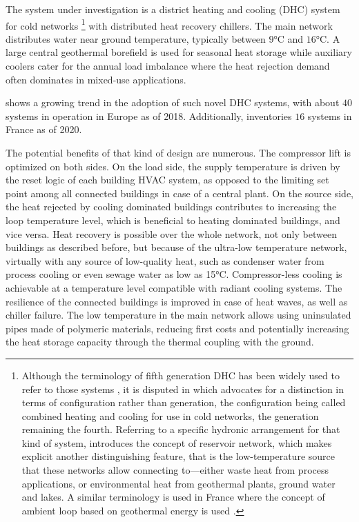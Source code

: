 The system under investigation is a district heating and cooling (DHC) system for cold networks%
\footnote{%
Although the terminology of fifth generation DHC has been widely used to refer to those systems \citep{Buffa2019}, it is disputed in \citep{Sulzer2021} which advocates for a distinction in terms of configuration rather than generation, the configuration being called combined heating and cooling for use in cold networks, the generation remaining the fourth.
Referring to a specific hydronic arrangement for that kind of system, \cite{Sommer2020} introduces the concept of reservoir network, which makes explicit another distinguishing feature, that is the low-temperature source that these networks allow connecting to---either waste heat from process applications, or environmental heat from geothermal plants, ground water and lakes.
A similar terminology is used in France where the concept of ambient loop based on geothermal energy is used \citep{Afpg2020}.}
with distributed heat recovery chillers.
The main network distributes water near ground temperature, typically between $9$°C and $16$°C. A large central geothermal borefield is used for seasonal heat storage while auxiliary coolers cater for the annual load imbalance where the heat rejection demand often dominates in mixed-use applications.

\cite{Buffa2019} shows a growing trend in the adoption of such novel DHC systems, with about $40$ systems in operation in Europe as of 2018.
Additionally, \cite{Afpg2020} inventories $16$ systems in France as of 2020.

The potential benefits of that kind of design are numerous.
The compressor lift is optimized on both sides. On the load side, the supply temperature is driven by the reset logic of each building HVAC system, as opposed to the limiting set point among all connected buildings in case of a central plant. On the source side, the heat rejected by cooling dominated buildings contributes to increasing the loop temperature level, which is beneficial to heating dominated buildings, and vice versa.
Heat recovery is possible over the whole network, not only between buildings as described before, but because of the ultra-low temperature network, virtually with any source of low-quality heat, such as condenser water from process cooling or even sewage water as low as 15°C.
Compressor-less cooling is achievable at a temperature level compatible with radiant cooling systems.
The resilience of the connected buildings is improved in case of heat waves, as well as chiller failure.
The low temperature in the main network allows using uninsulated pipes made of polymeric materials, reducing first costs and potentially increasing the heat storage capacity through the thermal coupling with the ground.

